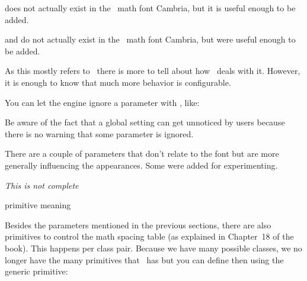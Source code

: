 \startitem
     does not actually exist in the
     \OPENTYPE\ math font Cambria, but it is useful enough to be
    added.
\stopitem

\startitem
     and 
    do not actually exist in the  \OPENTYPE\ math font Cambria,
    but were useful enough to be added.
\stopitem

\stopitemize

As this mostly refers to \LUATEX\ there is more to tell about how \LUAMETATEX\
deals with it. However, it is enough to know that much more behavior is
configurable.

You can let the engine ignore a parameter with \typ {\setmathignore}, like:

\starttyping
\setmathignore {}
\setmathignore {}
\stoptyping

Be aware of the fact that a global setting can get unnoticed by users because
there is no warning that some parameter is ignored.

There are a couple of parameters that don't relate to the font but are more generally
influencing the appearances. Some were added for experimenting.

{\em This is not complete}

\starttabulate[|l|l|]
\FL
\BC primitive \BC meaning \NC \NR
\TL
\type {\Umathextrasubpreshift} \NC \NR
\type {\Umathextrasubprespace} \NC \NR
\type {\Umathextrasubshift}    \NC \NR
\type {\Umathextrasubspace}    \NC \NR
\type {\Umathextrasuppreshift} \NC \NR
\type {\Umathextrasupprespace} \NC \NR
\type {\Umathextrasupshift}    \NC \NR
\type {\Umathextrasupspace}    \NC \NR
\type {\Umathprimeshiftdrop}   \NC \NR
\LL
\stoptabulate

\stopsection

\startsection[title={Math spacing}]

Besides the parameters mentioned in the previous sections, there are also
primitives to control the math spacing table (as explained in Chapter~18 of the
\TEX book). This happens per class pair. Because we have many possible classes,
we no longer have the many primitives that \LUATEX\ has but you can define then
using the generic \type {\setmathspacing} primitive:

\starttyping
\def\Umathordordspacing     {\setmathspacing 0 0 }
\def\Umathordordopenspacing {\setmathspacing 0 4 }
\stoptyping

